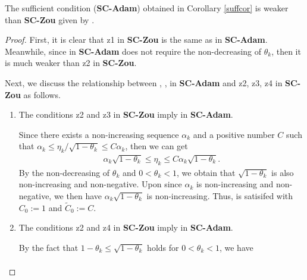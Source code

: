 \documentclass[twoside,11pt]{article}
\begin{document}
\begin{proposition}\label{contopro}
The sufficient condition (\textbf{SC-Adam}) obtained in Corollary \ref{suffcor} is weaker than \textbf{SC-Zou} given by \citet{zou2019sufficient}.
\end{proposition}
\begin{proof}
First, it is clear that \textcircled{\scriptsize {z1}} in \textbf{SC-Zou} is the same as  in \textbf{SC-Adam}. Meanwhile, since   in \textbf{SC-Adam} does not require the non-decreasing of $\theta_{k}$, then it is much weaker than \textcircled{\scriptsize {z2}} in \textbf{SC-Zou}. 
\par Next, we discuss the relationship between , ,  in \textbf{SC-Adam} and \textcircled{\scriptsize {z2}}, \textcircled{\scriptsize {z3}}, \textcircled{\scriptsize {z4}} in \textbf{SC-Zou} as follows.
\begin{enumerate}
\item[$(1)$] The conditions \textcircled{\scriptsize {z2}} and \textcircled{\scriptsize {z3}} in \textbf{SC-Zou} imply  in \textbf{SC-Adam}.
\par Since there exists a non-increasing sequence $\alpha_k$ and a positive number $C$ such that
$\alpha_k\le\eta_k/\sqrt{1-\theta_k}\le C \alpha_k$, then we can get
\begin{equation}\label{pro.9}
	\begin{aligned}
		\alpha_k \sqrt{1-\theta_k}\le\eta_k\le C \alpha_k \sqrt{1-\theta_k}.
	\end{aligned}
\end{equation}
By the non-decreasing of $\theta_k$ and $0<\theta_k<1$, we obtain that $\sqrt{1-\theta_k}$ is also non-increasing and non-negative. Upon since $\alpha_k$ is non-increasing and non-negative, we then have $\alpha_k \sqrt{1-\theta_k}$ is non-increasing. Thus,  is satisifed with $C_0:=1$ and $\tilde{C}_0:=C$.
\item[$(2)$] The conditions \textcircled{\scriptsize {z2}} and \textcircled{\scriptsize {z4}} in \textbf{SC-Zou} imply  in \textbf{SC-Adam}.
\par  By the fact that $1-\theta_k\le\sqrt{1-\theta_k}$ holds for $0<\theta_k<1$, we have
\begin{equation}\label{pro.10}
	\begin{aligned}

\end{aligned}
\end{equation}
\end{enumerate}
\end{proof}
\end{document}
